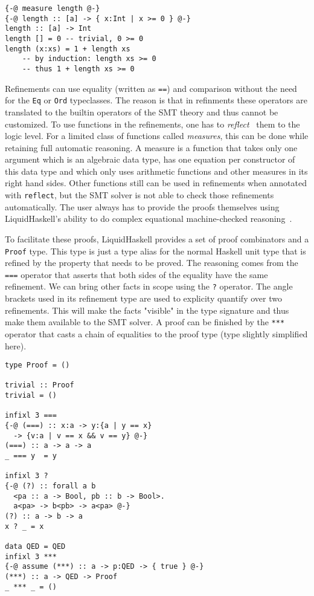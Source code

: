 \documentclass[sigplan,screen]{acmart}
\begin{document}
\begin{lstlisting}
{-@ measure length @-}
{-@ length :: [a] -> { x:Int | x >= 0 } @-}
length :: [a] -> Int
length [] = 0 -- trivial, 0 >= 0
length (x:xs) = 1 + length xs
    -- by induction: length xs >= 0
    -- thus 1 + length xs >= 0
\end{lstlisting}

Refinements can use equality (written as \texttt{==}) and comparison without the need for the \texttt{Eq} or \texttt{Ord} typeclasses. The reason is that in refinments these operators are translated to the builtin operators of the SMT theory and thus cannot be customized. To use functions in the refinements, one has to \textit{reflect}~\cite{reflection} them to the logic level. For a limited class of functions called \textit{measures}, this can be done while retaining full automatic reasoning. A measure is a function that takes only one argument which is an algebraic data type, has one equation per constructor of this data type and which only uses arithmetic functions and other measures in its right hand sides. Other functions still can be used in refinements when annotated with \texttt{reflect}, but the SMT solver is not able to check those refinements automatically. The user always has to provide the proofs themselves using LiquidHaskell's ability to do complex equational machine-checked reasoning~\cite{tpfa}.

To facilitate these proofs, LiquidHaskell provides a set of proof combinators and a \texttt{Proof} type. This type is just a type alias for the normal Haskell unit type that is refined by the property that needs to be proved. The reasoning comes from the \texttt{===} operator that asserts that both sides of the equality have the same refinement. We can bring other facts in scope using the \texttt{?} operator. The angle brackets used in its refinement type are used to explicity quantify over two refinements. This will make the facts "visible" in the type signature and thus make them available to the SMT solver. A proof can be finished by the \texttt{***} operator that casts a chain of equalities to the proof type (type slightly simplified here).

\begin{lstlisting}
type Proof = ()

trivial :: Proof
trivial = ()

infixl 3 ===
{-@ (===) :: x:a -> y:{a | y == x}
  -> {v:a | v == x && v == y} @-}
(===) :: a -> a -> a
_ === y  = y

infixl 3 ?
{-@ (?) :: forall a b
  <pa :: a -> Bool, pb :: b -> Bool>.
  a<pa> -> b<pb> -> a<pa> @-}
(?) :: a -> b -> a 
x ? _ = x 

data QED = QED
infixl 3 ***
{-@ assume (***) :: a -> p:QED -> { true } @-}
(***) :: a -> QED -> Proof
_ *** _ = ()
\end{lstlisting}
\end{document}

